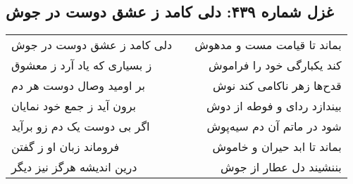 \begin{center}
\section*{غزل شماره ۴۳۹: دلی کامد ز عشق دوست در جوش}
\label{sec:439}
\begin{longtable}{l p{0.5cm} r}
دلی کامد ز عشق دوست در جوش
&&
بماند تا قیامت مست و مدهوش
\\
ز بسیاری که یاد آرد ز معشوق
&&
کند یکبارگی خود را فراموش
\\
بر اومید وصال دوست هر دم
&&
قدح‌ها زهر ناکامی کند نوش
\\
برون آید ز جمع خود نمایان
&&
بیندازد ردای و فوطه از دوش
\\
اگر بی دوست یک دم زو برآید
&&
شود در ماتم آن دم سیه‌پوش
\\
فروماند زبان او ز گفتن
&&
بماند تا ابد حیران و خاموش
\\
درین اندیشه هرگز نیز دیگر
&&
بننشیند دل عطار از جوش
\\
\end{longtable}
\end{center}
